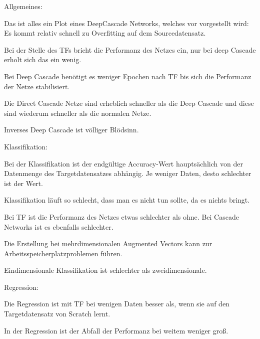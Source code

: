 Allgemeines:

Das ist alles ein Plot eines DeepCascade Networks, welches vor vorgestellt wird:
Es kommt relativ schnell zu Overfitting auf dem Sourcedatensatz. %

Bei der Stelle des TFs bricht die Performanz des Netzes ein, nur bei deep Cascade erholt sich das ein wenig. 

Bei Deep Cascade benötigt es weniger Epochen nach TF bis sich die Performanz der Netze stabilisiert. 

Die Direct Cascade Netze sind erheblich schneller als die Deep Cascade und diese sind wiederum schneller als die normalen Netze. 

Inverses Deep Cascade ist völliger Blödsinn. \newline

Klassifikation: 

Bei der Klassifikation ist der endgültige Accuracy-Wert hauptsächlich von der Datenmenge des Targetdatensatzes abhängig. 
Je weniger Daten, desto schlechter ist der Wert. %

Klassifikation läuft so schlecht, dass man es nicht tun sollte, da es nichts bringt. %

Bei TF ist die Performanz des Netzes etwas schlechter als ohne. %
Bei Cascade Networks ist es ebenfalls schlechter. %


Die Erstellung bei mehrdimensionalen Augmented Vectors kann zur Arbeitsspeicherplatzproblemen führen. %

Eindimensionale Klassifikation ist schlechter als zweidimensionale. \newline

Regression:

Die Regression ist mit TF bei wenigen Daten besser als, wenn sie auf den Targetdatensatz von Scratch lernt. %


In der Regression ist der Abfall der Performanz bei weitem weniger groß. %

